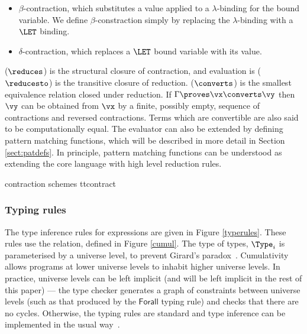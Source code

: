 \begin{itemize}
\item $\beta$-contraction, which substitutes a value applied to a $\lambda$-binding for
the bound variable. We define $\beta$-constraction simply by replacing the $\lambda$-binding
with a $\LET$ binding.
\item $\delta$-contraction, which replaces a $\LET$ bound variable with its value.
\end{itemize}

 ($\reduces$) is the structural closure of contraction, and evaluation
is ($\reducesto$) is the transitive closure of reduction.  ($\converts$)
is the smallest equivalence relation closed under reduction. If $\Gamma\proves\vx\converts\vy$
then $\vy$ can be obtained from $\vx$ by a finite, possibly empty, sequence of
contractions and reversed contractions. Terms which are convertible are also said to
be computationally equal.
The evaluator can also be extended by defining pattern matching functions, which
will be described in more detail in Section \ref{sect:patdefs}. In principle, pattern
matching functions can be understood as extending the core language with high level
reduction rules.

{\TT{} contraction schemes}
{ttcontract}



\subsubsection{Typing rules}

The type inference rules for \TT{} expressions are given in Figure \ref{typerules}.
These rules use the  relation, defined in 
Figure \ref{cumul}. The type of types, $\Type_i$ is parameterised by a universe level,
to prevent Girard's paradox~\cite{coquand1986analysis}. Cumulativity allows programs at
lower universe levels to inhabit higher universe levels. In practice, universe levels
can be left implicit (and will be left implicit in the rest of this paper) ---
the type checker generates a graph of constraints between universe levels (such
as that produced by the $\mathsf{Forall}$ typing rule) and checks that there
are no cycles. Otherwise, the typing rules are standard and type inference can
be implemented in the usual way~\cite{loh2010tutorial}.

